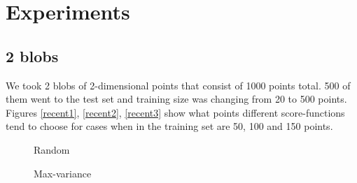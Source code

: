 \documentclass[a4paper]{article}
\begin{document}
\section{Experiments}

\subsection{2 blobs}

We took 2 blobs of 2-dimensional points that consist of 1000 points total. 500 of them went to the test set and training size was changing from 20 to 500 points. Figures \ref{recent1}, \ref{recent2}, \ref{recent3} show what points different score-functions tend to choose for cases when in the training set are 50, 100 and 150 points.

\begin{figure}[h]
\begin{minipage}[h]{0.49\linewidth}
 Random
\end{minipage}
\hfill
\begin{minipage}[h]{0.49\linewidth}
 Max-variance

\end{minipage}
\end{figure}
\end{document}
